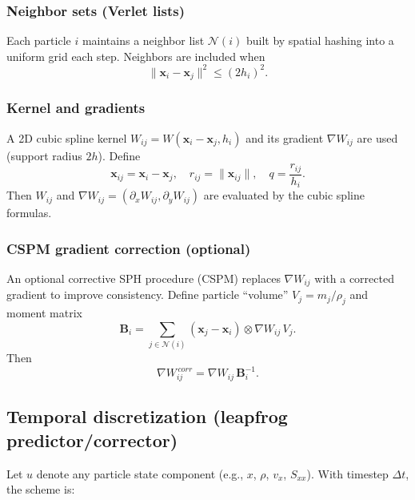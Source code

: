 \documentclass[11pt]{article}
\begin{document}
\subsubsection{Neighbor sets (Verlet lists)}

Each particle $i$ maintains a neighbor list $\mathcal{N}(i)$ built by spatial hashing into a uniform grid each step. Neighbors are included when
\begin{equation}
\|\bm{x}_i-\bm{x}_j\|^2 \le (2h_i)^2.
\label{eq:neighbor}
\end{equation}

\subsubsection{Kernel and gradients}

A 2D cubic spline kernel $W_{ij}=W(\bm{x}_i-\bm{x}_j,h_i)$ and its gradient $\nabla W_{ij}$ are used (support radius $2h$). Define
\begin{equation}
\bm{x}_{ij}=\bm{x}_i-\bm{x}_j,\quad r_{ij}=\|\bm{x}_{ij}\|,\quad q=\frac{r_{ij}}{h_i}.
\label{eq:qdef}
\end{equation}
Then $W_{ij}$ and $\nabla W_{ij}=(\partial_x W_{ij},\partial_y W_{ij})$ are evaluated by the cubic spline formulas.

\subsubsection{CSPM gradient correction (optional)}

An optional corrective SPH procedure (CSPM) replaces $\nabla W_{ij}$ with a corrected gradient to improve consistency. Define particle ``volume'' $V_j=m_j/\rho_j$ and moment matrix
\begin{equation}
\bm{B}_i=\sum_{j\in\mathcal{N}(i)} (\bm{x}_j-\bm{x}_i)\otimes \nabla W_{ij}\,V_j.
\label{eq:Bi}
\end{equation}
Then
\begin{equation}
\nabla W_{ij}^{\,corr} = \nabla W_{ij}\,\bm{B}_i^{-1}.
\label{eq:cspm}
\end{equation}

\subsection{Temporal discretization (leapfrog predictor/corrector)}

Let $u$ denote any particle state component (e.g., $x$, $\rho$, $v_x$, $S_{xx}$). With timestep $\Delta t$, the scheme is:
\end{document}

